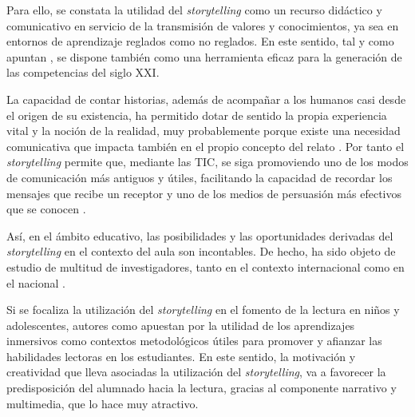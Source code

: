 \documentclass[spanish]{textolivre}
\begin{document}
Para ello, se constata la utilidad del \textit{storytelling} como un recurso didáctico y comunicativo en servicio de la transmisión de valores y conocimientos, ya sea en entornos de aprendizaje reglados como no reglados. En este sentido, tal y como apuntan \textcite{gregori-signes_digital_2012,robin_digital_2008}, se dispone también como una herramienta eficaz para la generación de las competencias del siglo XXI.

La capacidad de contar historias, además de acompañar a los humanos casi desde el origen de su existencia, ha permitido dotar de sentido la propia experiencia vital y la noción de la realidad, muy probablemente porque existe una necesidad comunicativa que impacta también en el propio concepto del relato \cite{ricoeur_tiempo_1987}. Por tanto el \textit{storytelling} permite que, mediante las TIC, se siga promoviendo uno de los modos de comunicación más antiguos y útiles, facilitando la capacidad de recordar los mensajes que recibe un receptor y uno de los medios de persuasión más efectivos que se conocen \cite{delgado-ballester_once_2016}.

Así, en el ámbito educativo, las posibilidades y las oportunidades derivadas del \textit{storytelling} en el contexto del aula son incontables. De hecho, ha sido objeto de estudio de multitud de investigadores, tanto en el contexto internacional \cite{abrahamson_storytelling_1998,coulter_storytelling_2007,ferreira_motivating_2021} como en el nacional \cite{illera_relatos_2009,villalustre_martinez_digital_2014}.

Si se focaliza la utilización del \textit{storytelling} en el fomento de la lectura en niños y adolescentes, autores como \textcite{ferreira_motivating_2021} apuestan por la utilidad de los aprendizajes inmersivos como contextos metodológicos útiles para promover y afianzar las habilidades lectoras en los estudiantes. En este sentido, la motivación y creatividad que lleva asociadas la utilización del \textit{storytelling}, va a favorecer la predisposición del alumnado hacia la lectura, gracias al componente narrativo y multimedia, que lo hace muy atractivo.
\end{document}
